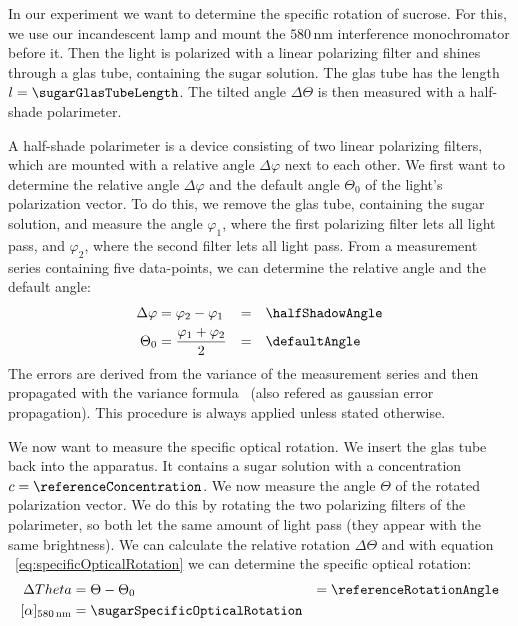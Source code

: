 \documentclass[a4paper,10pt,twocolumn]{article}
\newcommand{\unit}[1]{\, \mathrm{#1}}
\newcommand{\nm}{\unit{nm}}
\newcommand{\wavelengthYellow}{580 \nm}
\newcommand{\specRot}{[\alpha]_{\wavelengthYellow}}
\begin{document}
    In our experiment we want to determine the specific rotation of sucrose.
    For this, we use our incandescent lamp and mount the $\wavelengthYellow$ interference monochromator
    before it.
    Then the light is polarized with a linear polarizing filter and shines through
    a glas tube, containing the sugar solution.
    The glas tube has the length $l = \sugarGlasTubeLength$.
    The tilted angle $\Delta \Theta$ is then measured with a half-shade polarimeter.
    
    A half-shade polarimeter is a device consisting of two linear polarizing filters, which are mounted
    with a relative angle $\Delta \varphi$ next to each other.
    We first want to determine the relative angle $\Delta \varphi$ and the default angle $\Theta_0$ of
    the light's polarization vector.
    To do this, we remove the glas tube, containing the sugar solution, and measure the angle 
    $\varphi_1$, where the first polarizing filter lets all light pass, and $\varphi_2$, where
    the second filter lets all light pass.
    From a measurement series containing five data-points, we can determine the relative angle
    and the default angle:
    \begin{align*}
        \Delta \varphi & = \varphi_2 - \varphi_1 & = & \quad \halfShadowAngle \\
        \Theta_0 & = \frac{\varphi_1 + \varphi_2}{2} & = & \quad \defaultAngle
    \end{align*}
    The errors are derived from the variance of the measurement series and then propagated with
    the variance formula~\cite{errorPropagation} (also refered as gaussian error propagation).
    This procedure is always applied unless stated otherwise.
    
    We now want to measure the specific optical rotation.
    We insert the glas tube back into the apparatus.
    It contains a sugar solution with a concentration $c = \referenceConcentration$.
    We now measure the angle $\Theta$ of the rotated polarization vector.
    We do this by rotating the two polarizing filters of the polarimeter, so both let the same amount of
    light pass (they appear with the same brightness).
    We can calculate the relative rotation $\Delta \Theta$ and with equation ~\eqref{eq:specificOpticalRotation}
    we can determine the specific optical rotation:
    \begin{align*}
        \Delta Theta &= \Theta - \Theta_0 &= \referenceRotationAngle \\
        \specRot &= \sugarSpecificOpticalRotation
    \end{align*}
    
\end{document}
